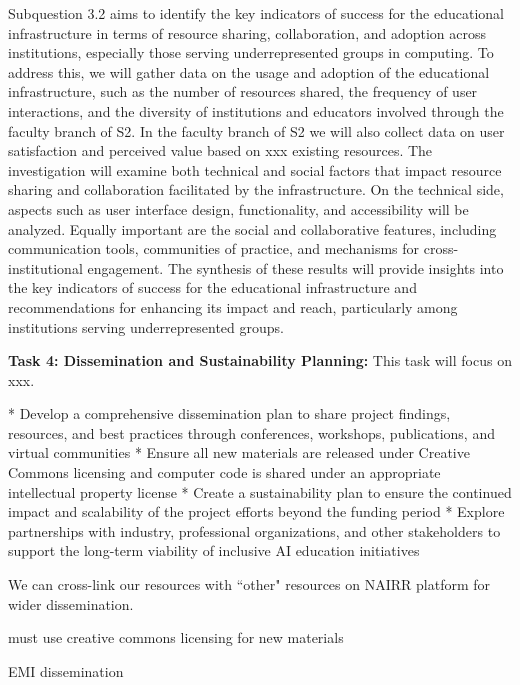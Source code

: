 \documentclass[11pt]{article}
\begin{document}
Subquestion 3.2 aims to identify the key indicators of success for the educational infrastructure in terms of resource sharing, collaboration, and adoption across institutions, especially those serving underrepresented groups in computing. 
To address this, we will gather data on the usage and adoption of the educational infrastructure, such as the number of resources shared, the frequency of user interactions, and the diversity of institutions and educators involved through the faculty branch of S2. 
In the faculty branch of S2 we will also collect data on user satisfaction and perceived value based on xxx existing resources. 
The investigation will examine both technical and social factors that impact resource sharing and collaboration facilitated by the infrastructure. On the technical side, aspects such as user interface design, functionality, and accessibility will be analyzed. Equally important are the social and collaborative features, including communication tools, communities of practice, and mechanisms for cross-institutional engagement.
The synthesis of these results will provide insights into the key indicators of success for the educational infrastructure and recommendations for enhancing its impact and reach, particularly among institutions serving underrepresented groups. 

\begin{tcolorbox}[colback=mycmykcolor, colframe=black, boxrule=1pt, coltext=black]
\textbf{Task 4: Dissemination and Sustainability Planning:} This task will focus on xxx.
\end{tcolorbox}

* Develop a comprehensive dissemination plan to share project findings, resources, and best practices through conferences, workshops, publications, and virtual communities
* Ensure all new materials are released under Creative Commons licensing and computer code is shared under an appropriate intellectual property license
* Create a sustainability plan to ensure the continued impact and scalability of the project efforts beyond the funding period
* Explore partnerships with industry, professional organizations, and other stakeholders to support the long-term viability of inclusive AI education initiatives

We can cross-link our resources with ``other" resources on NAIRR platform for wider dissemination. 

must use creative commons licensing for new materials

EMI dissemination
\end{document}
